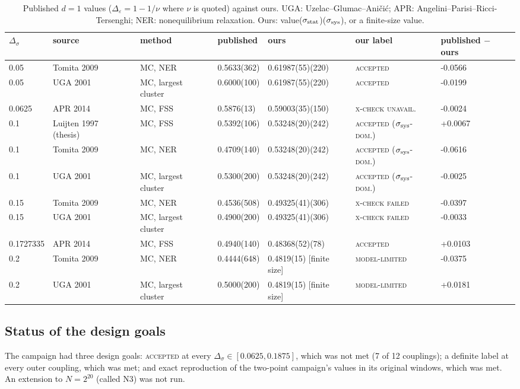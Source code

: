 \documentclass[10pt,a4paper]{article}
\newcommand{\Ds}{\Delta_\sigma}
\newcommand{\De}{\Delta_\varepsilon}
\newcommand{\lbl}[1]{{\mdseries\scshape #1}}
\newcommand{\sstat}{\sigma_{\rm stat}}
\newcommand{\ssys}{\sigma_{\rm sys}}
\begin{document}
\begin{table}[htbp]\centering\scriptsize
\caption{Published $d=1$ values ($\De=1-1/\nu$ where $\nu$ is quoted) against ours. UGA: Uzelac--Glumac--Ani\v{c}i\'c; APR: Angelini--Parisi--Ricci-Tersenghi; NER: nonequilibrium relaxation. Ours: value($\sstat$)($\ssys$), or a finite-size value.}\label{tab:lit1d}
\setlength{\tabcolsep}{2.5pt}\begin{tabular}{@{}lllllll@{}}\toprule
$\Ds$ & source & method & published & ours & our label & published $-$ ours \\\midrule
0.05 & Tomita 2009~\cite{Tomita:2009mc} & MC, NER & 0.5633(362) & 0.61987(55)(220) & \lbl{accepted} & -0.0566 \\
0.05 & UGA 2001~\cite{Uzelac:2001lc} & MC, largest cluster & 0.6000(100) & 0.61987(55)(220) & \lbl{accepted} & -0.0199 \\
0.0625 & APR 2014~\cite{Angelini:2014koy} & MC, FSS & 0.5876(13) & 0.59003(35)(150) & \lbl{x-check unavail.} & -0.0024 \\
0.1 & Luijten 1997 (thesis)~\cite{Luijten:1997th} & MC, FSS & 0.5392(106) & 0.53248(20)(242) & \lbl{accepted ($\sigma_{\rm sys}$-dom.)} & +0.0067 \\
0.1 & Tomita 2009~\cite{Tomita:2009mc} & MC, NER & 0.4709(140) & 0.53248(20)(242) & \lbl{accepted ($\sigma_{\rm sys}$-dom.)} & -0.0616 \\
0.1 & UGA 2001~\cite{Uzelac:2001lc} & MC, largest cluster & 0.5300(200) & 0.53248(20)(242) & \lbl{accepted ($\sigma_{\rm sys}$-dom.)} & -0.0025 \\
0.15 & Tomita 2009~\cite{Tomita:2009mc} & MC, NER & 0.4536(508) & 0.49325(41)(306) & \lbl{x-check failed} & -0.0397 \\
0.15 & UGA 2001~\cite{Uzelac:2001lc} & MC, largest cluster & 0.4900(200) & 0.49325(41)(306) & \lbl{x-check failed} & -0.0033 \\
0.1727335 & APR 2014~\cite{Angelini:2014koy} & MC, FSS & 0.4940(140) & 0.48368(52)(78) & \lbl{accepted} & +0.0103 \\
0.2 & Tomita 2009~\cite{Tomita:2009mc} & MC, NER & 0.4444(648) & 0.4819(15) [finite size] & \lbl{model-limited} & -0.0375 \\
0.2 & UGA 2001~\cite{Uzelac:2001lc} & MC, largest cluster & 0.5000(200) & 0.4819(15) [finite size] & \lbl{model-limited} & +0.0181 \\
\bottomrule\end{tabular}
\end{table}

\subsection{Status of the design goals}
The campaign had three design goals: \lbl{accepted} at every $\Ds\in[0.0625,0.1875]$, which was not met (7 of 12 couplings); a definite label
at every outer coupling, which was met; and exact reproduction of the two-point campaign's values in its original windows, which was met. An
extension to $N=2^{20}$ (called N3) was not run.
\end{document}
